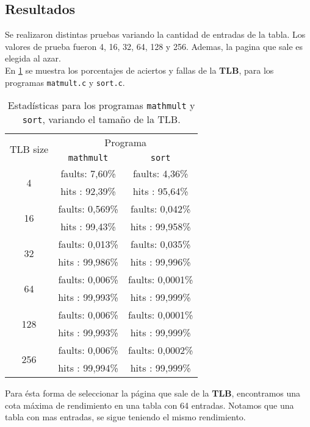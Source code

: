 \subsection*{Resultados}
Se realizaron distintas pruebas variando la cantidad de entradas de la tabla. Los valores de prueba fueron 4, 16, 32, 64, 128 y 256. Ademas, la pagina que sale es elegida al azar.\\
En \ref{tab:practica04:statics} se muestra los porcentajes de aciertos y fallas de la \textbf{TLB}, para los programas \texttt{matmult.c} y \texttt{sort.c}.\\ 
\begin{table}
	\center
	\begin{tabular}{|c|c|c|}
	    \hline
		\multirow{2}{*}{TLB size}   &    \multicolumn{2}{c|}{Programa}           \\
		\cline{2-3}
                                    &    \texttt{mathmult}    &    \texttt{sort} \\
		\hline
		\multirow{2}{*}{4}          &     faults:  7,60\%     &    faults:  4,36\% \\
		                            &     hits  : 92,39\%     &    hits  : 95,64\%    \\               
		\multirow{2}{*}{16}         &     faults:  0,569\%    &    faults:  0,042\%    \\
		                            &     hits  : 99,43\%     &    hits  : 99,958\%    \\             
		\multirow{2}{*}{32}         &     faults:  0,013\%    &    faults:  0,035\%    \\
		                            &     hits  : 99,986\%    &    hits  : 99,996\%    \\               
		\multirow{2}{*}{64}         &     faults:  0,006\%    &    faults:  0,0001\%    \\
		                            &     hits  : 99,993\%    &    hits  : 99,999\%    \\               
		\multirow{2}{*}{128}        &     faults:  0,006\%    &    faults:  0,0001\%    \\
		                            &     hits  : 99,993\%    &    hits  : 99,999\%    \\               
		\multirow{2}{*}{256}        &     faults:  0,006\%    &    faults:  0,0002\%    \\
		                            &     hits  : 99,994\%    &    hits  : 99,999\%    \\ \hline             
	\end{tabular}
    \caption{Estadísticas para los programas \texttt{mathmult} y \texttt{sort}, variando el tamaño de la TLB.}
	\label{tab:practica04:statics}
\end{table}
Para ésta forma de seleccionar la página  que sale de la \textbf{TLB}, encontramos una cota máxima de rendimiento en una tabla con 64 entradas. Notamos que una tabla con mas entradas, se sigue teniendo el mismo rendimiento.
\newpage
